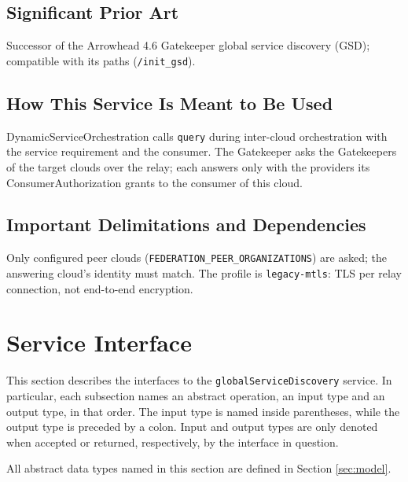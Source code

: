 \documentclass[a4paper]{arrowhead}
\begin{document}
\subsection{Significant Prior Art}

Successor of the Arrowhead 4.6 Gatekeeper global service discovery (GSD); compatible with its paths (\texttt{/\allowbreak{}init\_\allowbreak{}gsd}).

\subsection{How This Service Is Meant to Be Used}

Dynamic\allowbreak{}Service\allowbreak{}Orchestration calls \texttt{query} during inter-cloud orchestration with the service requirement and the consumer. The Gatekeeper asks the Gatekeepers of the target clouds over the relay; each answers only with the providers its Consumer\allowbreak{}Authorization grants to the consumer of this cloud.

\subsection{Important Delimitations and Dependencies}
\label{sec:delimitations}

Only configured peer clouds (\texttt{FEDERATION\_\allowbreak{}PEER\_\allowbreak{}ORGANIZATIONS}) are asked; the answering cloud's identity must match. The profile is \texttt{legacy-\allowbreak{}mtls}: TLS per relay connection, not end-to-end encryption.

\newpage

\section{Service Interface}
\label{sec:operations}

This section describes the interfaces to the \texttt{global\allowbreak{}Service\allowbreak{}Discovery} service.
In particular, each subsection names an abstract operation, an input type and an output type, in that order.
The input type is named inside parentheses, while the output type is preceded by a colon.
Input and output types are only denoted when accepted or returned, respectively, by the interface in question.

All abstract data types named in this section are defined in Section \ref{sec:model}.
\end{document}

